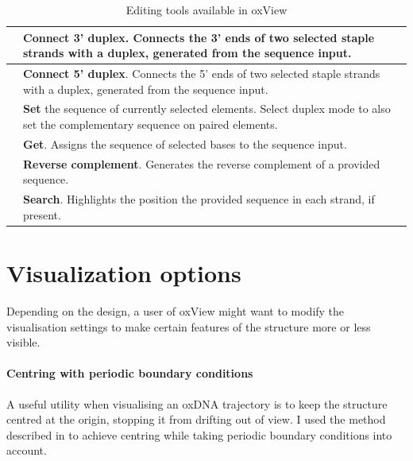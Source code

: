 \begin{table}[ht]
\begin{tabularx}{\textwidth} { >{\centering\arraybackslash}m{3em} | X }
 & \textbf{Connect 3' duplex}. Connects the 3' ends of two selected staple strands with a duplex, generated from the sequence input. \\ \hline
 & \textbf{Connect 5' duplex}. Connects the 5' ends of two selected staple strands with a duplex, generated from the sequence input. \\ \hline
 & \textbf{Set} the sequence of currently selected elements. Select duplex mode to also set the complementary sequence on paired elements. \\ \hline
 & \textbf{Get}. Assigns the sequence of selected bases to the sequence input.  \\ \hline
 & \textbf{Reverse complement}. Generates the reverse complement of a provided sequence. \\ \hline
 & \textbf{Search}. Highlights the position the provided sequence in each strand, if present. \\ \hline
\end{tabularx}

\caption{Editing tools available in oxView}
\label{table:edit_tools}
\end{table}



\section{Visualization options}
Depending on the design, a user of oxView might want to modify the visualisation settings to make certain features of the structure more or less visible.

\paragraph{Centring with periodic boundary conditions} A useful utility when visualising an oxDNA trajectory is to keep the structure centred at the origin, stopping it from drifting out of view. I used the method described in \cite{PBC_centring} to achieve centring while taking periodic boundary conditions into account.


